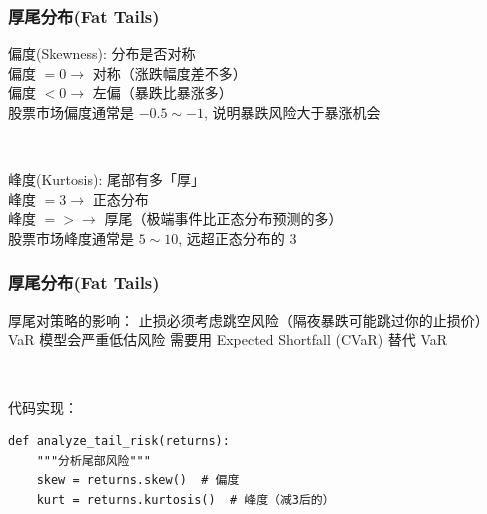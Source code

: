 \begin{frame}
	\frametitle{厚尾分布(Fat Tails)}
	
	\alert{偏度(Skewness)}: 分布是否对称 \\
    \hspace{2em} 偏度 $= 0 \rightarrow$ 对称（涨跌幅度差不多） \\
    \hspace{2em} 偏度 $< 0 \rightarrow$ 左偏（暴跌比暴涨多） \\
    \hspace{2em} 股票市场偏度通常是 $-0.5 \sim -1$, 说明暴跌风险大于暴涨机会

    ~\par
    \alert{峰度(Kurtosis)}: 尾部有多「厚」 \\
    \hspace{2em} 峰度 $= 3 \rightarrow$ 正态分布 \\
    \hspace{2em} 峰度 $= > \rightarrow$ 厚尾（极端事件比正态分布预测的多） \\
    \hspace{2em} 股票市场峰度通常是 $5 \sim 10$, 远超正态分布的 3
\end{frame}

\begin{frame}[fragile]
	\frametitle{厚尾分布(Fat Tails)}

    厚尾对策略的影响：
    \hspace{2em} 止损必须考虑跳空风险（隔夜暴跌可能跳过你的止损价）
    \hspace{2em} VaR 模型会严重低估风险
    \hspace{2em} 需要用 Expected Shortfall (CVaR) 替代 VaR

    ~\par
    代码实现：
    \begin{verbatim}
def analyze_tail_risk(returns):
    """分析尾部风险"""
    skew = returns.skew()  # 偏度
    kurt = returns.kurtosis()  # 峰度（减3后的）
    \end{verbatim}
\end{frame}

